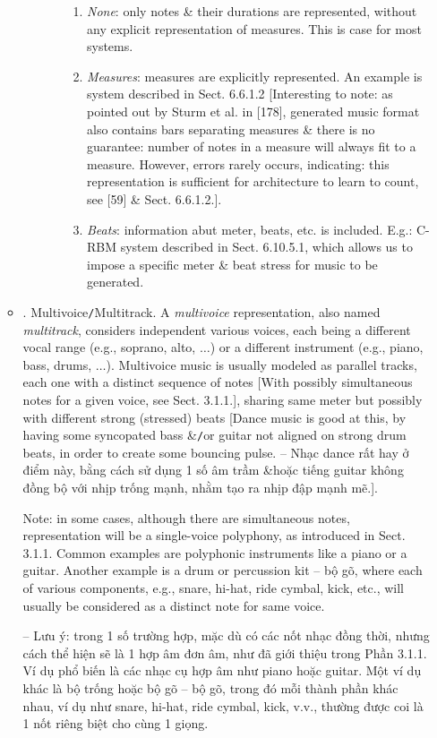 \documentclass{article}
\begin{document}
\begin{itemize}
\begin{itemize}
\begin{itemize}
\begin{itemize}
\begin{enumerate}
					\item {\it None}: only notes \& their durations are represented, without any explicit representation of measures. This is case for most systems.
					\item {\it Measures}: measures are explicitly represented. An example is system described in Sect. 6.6.1.2 [Interesting to note: as pointed out by Sturm et al. in [178], generated music format also contains bars separating measures \& there is no guarantee: number of notes in a measure will always fit to a measure. However, errors rarely occurs, indicating: this representation is sufficient for architecture to learn to count, see [59] \& Sect. 6.6.1.2.].
					\item {\it Beats}: information abut meter, beats, etc. is included. E.g.: C-RBM system described in Sect. 6.10.5.1, which allows us to impose a specific meter \& beat stress for music to be generated.
				\end{enumerate}
			\end{itemize}
		\end{itemize}
		\item {. Multivoice{\tt/}Multitrack.} A {\it multivoice} representation, also named {\it multitrack}, considers independent various voices, each being a different vocal range (e.g., soprano, alto, $\ldots$) or a different instrument (e.g., piano, bass, drums, $\ldots$). Multivoice music is usually modeled as  parallel tracks, each one with a distinct sequence of notes [With possibly simultaneous notes for a given voice, see Sect. 3.1.1.], sharing same meter but possibly with different strong (stressed) beats [Dance music is good at this, by having some syncopated bass \&{\tt/}or guitar not aligned on strong drum beats, in order to create some bouncing pulse. -- Nhạc dance rất hay ở điểm này, bằng cách sử dụng 1 số âm trầm \&{\tt}hoặc tiếng guitar không đồng bộ với nhịp trống mạnh, nhằm tạo ra nhịp đập mạnh mẽ.].

		Note: in some cases, although there are simultaneous notes, representation will be a single-voice polyphony, as introduced in Sect. 3.1.1. Common examples are polyphonic instruments like a piano or a guitar. Another example is a drum or percussion kit -- bộ gõ, where each of various components, e.g., snare, hi-hat, ride cymbal, kick, etc., will usually be considered as a distinct note for same voice.

		-- Lưu ý: trong 1 số trường hợp, mặc dù có các nốt nhạc đồng thời, nhưng cách thể hiện sẽ là 1 hợp âm đơn âm, như đã giới thiệu trong Phần 3.1.1. Ví dụ phổ biến là các nhạc cụ hợp âm như piano hoặc guitar. Một ví dụ khác là bộ trống hoặc bộ gõ -- bộ gõ, trong đó mỗi thành phần khác nhau, ví dụ như snare, hi-hat, ride cymbal, kick, v.v., thường được coi là 1 nốt riêng biệt cho cùng 1 giọng.


\end{itemize}
\end{itemize}
\end{document}
